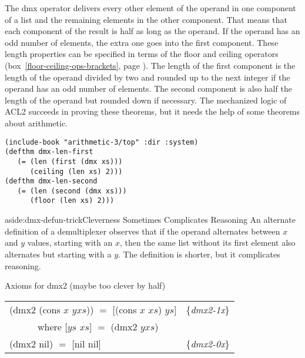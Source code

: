 The \textsf{dmx} operator delivers every other element of the operand in
one component of a list and the remaining elements in the other component.
That means that each component of the result is half as long as the operand.
If the operand has an odd number of elements, the extra one goes into the first component.
These length properties can be specified in terms of the \textsf{floor} and \textsf{ceiling}
operators (box~\ref{floor-ceiling-ops-brackets}, page \pageref{floor-ceiling-ops-brackets}).
The length of the first component is the length of the operand divided by two
and rounded up to the next integer if the operand has an odd number of elements.
The second component is also half the length of the operand but rounded down if necessary.
The mechanized logic of ACL2 succeeds in proving these theorems,
but it needs the help of some theorems about arithmetic.

\label{thm:dmx-length-first-second}
\begin{code}
\begin{verbatim}
(include-book "arithmetic-3/top" :dir :system)
(defthm dmx-len-first
   (= (len (first (dmx xs)))
      (ceiling (len xs) 2)))
(defthm dmx-len-second
   (= (len (second (dmx xs)))
      (floor (len xs) 2)))
\end{verbatim}
\end{code}

\begin{aside}{aside:dmx-defun-trick}{Cleverness Sometimes Complicates Reasoning}
An alternate definition of a demultiplexer
observes that if the operand alternates between $x$ and $y$ values,
starting with an $x$,
then the same list without its first element also alternates
but starting with a $y$. The definition is shorter,
but it complicates reasoning.
\begin{center}
Axioms for \textsf{dmx2} (maybe too clever by half)
\begin{tabular}{ll}
\textsf{(dmx2 (cons $x$ $yxs$)) $=$ [(cons $x$ $xs$) $ys$]}& \{\emph{dmx2-1x}\} \\
~~~~~~where \textsf{[$ys$ $xs$] $=$ (dmx2 $yxs$)}          & \\
\textsf{(dmx2 nil) $=$ [nil nil] }                         & \{\emph{dmx2-0x}\} \\
\end{tabular}
\end{center}
\end{aside}

